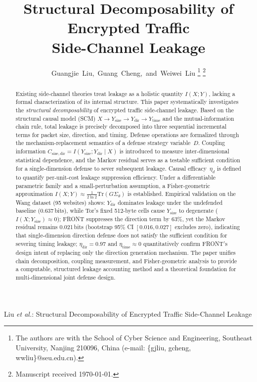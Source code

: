 \documentclass[lettersize,journal]{IEEEtran}
\begin{document}
\title{Structural Decomposability of Encrypted Traffic\\ Side-Channel Leakage}

\author{Guangjie~Liu,~Guang~Cheng,~and~Weiwei~Liu%
\thanks{The authors are with the School of Cyber Science and Engineering,
Southeast University, Nanjing 210096, China
(e-mail: \{gjliu, gcheng, wwliu\}@seu.edu.cn).}%
\thanks{Manuscript received \today.}}

%
{Liu \MakeLowercase{\textit{et al.}}: Structural Decomposability of Encrypted Traffic Side-Channel Leakage}

\maketitle

\begin{abstract}
Existing side-channel theories treat leakage as a holistic quantity
$I(X;Y)$, lacking a formal characterization of its internal structure.
This paper systematically investigates the \emph{structural
decomposability} of encrypted traffic side-channel leakage.
Based on the structural causal model (SCM)
$X\!\to\!Y_{\mathrm{size}}\!\to\!Y_{\mathrm{dir}}\!\to\!Y_{\mathrm{time}}$
and the mutual-information chain rule, total leakage is precisely
decomposed into three sequential incremental terms for packet size,
direction, and timing.
Defense operations are formalized through the mechanism-replacement
semantics of a defense strategy variable~$D$.
Coupling information $C_{\mathrm{size,dir}}=I(Y_{\mathrm{size}};Y_{\mathrm{dir}}\!\mid\! X)$
is introduced to measure inter-dimensional statistical dependence,
and the Markov residual serves as a testable sufficient condition for
a single-dimension defense to sever subsequent leakage.
Causal efficacy~$\eta_d$ is defined to quantify per-unit-cost leakage
suppression efficiency.
Under a differentiable parametric family and a small-perturbation
assumption, a Fisher-geometric approximation
$I(X;Y)\approx\frac{1}{2\ln 2}\mathrm{Tr}(G\Sigma_\theta)$
is established.
Empirical validation on the Wang dataset (95 websites) shows:
$Y_{\mathrm{dir}}$ dominates leakage under the undefended baseline
(0.637\,bits), while Tor's fixed 512-byte cells cause
$Y_{\mathrm{size}}$ to degenerate ($I(X;Y_{\mathrm{size}})\!\approx\!0$);
FRONT suppresses the direction term by 63\%, yet the Markov residual
remains 0.021\,bits (bootstrap 95\% CI $[0.016,0.027]$ excludes zero),
indicating that single-dimension direction defense does not satisfy the
sufficient condition for severing timing leakage;
$\eta_{\mathrm{dir}}=0.97$ and $\eta_{\mathrm{time}}\approx 0$
quantitatively confirm FRONT's design intent of replacing only the
direction generation mechanism.
The paper unifies chain decomposition, coupling measurement, and
Fisher-geometric analysis to provide a computable, structured leakage
accounting method and a theoretical foundation for multi-dimensional
joint defense design.
\end{abstract}
\end{document}
